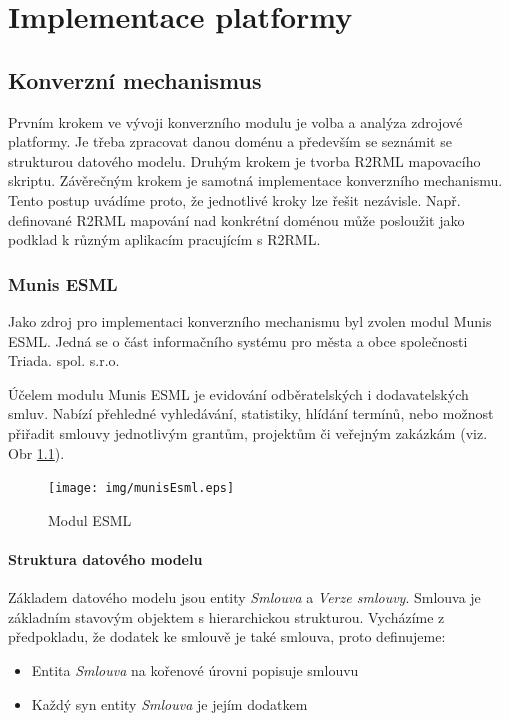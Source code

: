\chapter{Implementace platformy}

\section{Konverzní mechanismus}

Prvním krokem ve vývoji konverzního modulu je volba a analýza zdrojové platformy. Je třeba zpracovat danou doménu a především se seznámit se strukturou datového modelu. Druhým krokem je tvorba R2RML mapovacího skriptu. Závěrečným krokem je samotná implementace konverzního mechanismu. Tento postup uvádíme proto, že jednotlivé kroky lze řešit nezávisle. Např. definované R2RML mapování nad konkrétní doménou může posloužit jako podklad k různým aplikacím pracujícím s R2RML. 

\subsection{Munis ESML}

Jako zdroj pro implementaci konverzního mechanismu byl zvolen modul Munis ESML. Jedná se o část informačního systému pro města a obce společnosti Triada. spol. s.r.o.

Účelem modulu Munis ESML je evidování odběratelských i dodavatelských smluv. Nabízí přehledné vyhledávání, statistiky, hlídání termínů, nebo možnost přiřadit smlouvy jednotlivým grantům, projektům či veřejným zakázkám (viz. Obr \ref{obr:munisEsml}).

\begin{figure}[H]
\centerline{\texttt{[image: img/munisEsml.eps]}}
\caption{Modul ESML}
\label{obr:munisEsml}
\end{figure}

\newpage

\subsubsection{Struktura datového modelu}

Základem datového modelu jsou entity \textit{Smlouva} a \textit{Verze smlouvy}. Smlouva je základním stavovým objektem s hierarchickou strukturou. Vycházíme z předpokladu, že dodatek ke smlouvě je také smlouva, proto definujeme:

\begin{itemize}
\item Entita \textit{Smlouva} na kořenové úrovni popisuje smlouvu
\item Každý syn entity \textit{Smlouva} je jejím dodatkem
\end{itemize}

